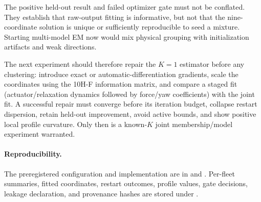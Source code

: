 The positive held-out result and failed optimizer gate must not be conflated.
They establish that raw-output fitting is informative, but not that the
nine-coordinate solution is unique or sufficiently reproducible to seed a
mixture. Starting multi-model EM now would mix physical grouping with
initialization artifacts and weak directions.

The next experiment should therefore repair the $K=1$ estimator before any
clustering: introduce exact or automatic-differentiation gradients, scale the
coordinates using the 10H-F information matrix, and compare a staged fit
(actuator/relaxation dynamics followed by force/yaw coefficients) with the
joint fit. A successful repair must converge before its iteration budget,
collapse restart dispersion, retain held-out improvement, avoid active
bounds, and show positive local profile curvature. Only then is a known-$K$
joint membership/model experiment warranted.

\paragraph{Reproducibility.}
The preregistered configuration and implementation are in
 and
. Per-fleet
summaries, fitted coordinates, restart outcomes, profile values, gate
decisions, leakage declaration, and provenance hashes are stored under
.
